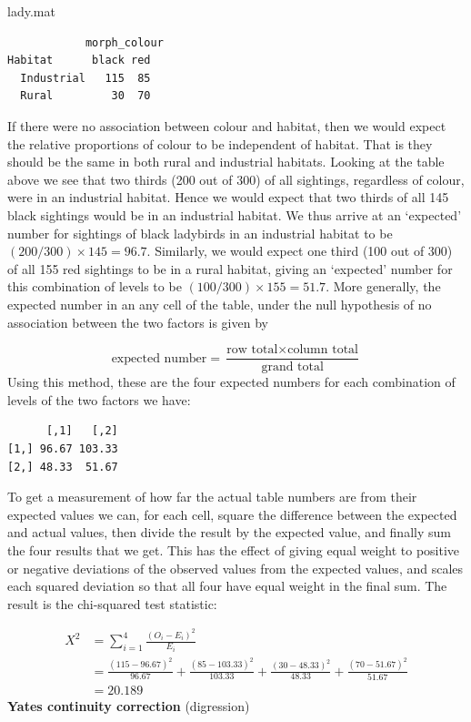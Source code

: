 \documentclass[
  letterpaper,
  DIV=11,
  numbers=noendperiod]{scrreprt}
\newenvironment{Shaded}{\begin{snugshade}}{\end{snugshade}}
\newcommand{\NormalTok}[1]{\textcolor[rgb]{0.00,0.23,0.31}{#1}}
\begin{document}
\begin{Shaded}
\begin{Highlighting}[]
\NormalTok{lady.mat}
\end{Highlighting}
\end{Shaded}

\begin{verbatim}
            morph_colour
Habitat      black red
  Industrial   115  85
  Rural         30  70
\end{verbatim}

If there were no association between colour and habitat, then we would
expect the relative proportions of colour to be independent of habitat.
That is they should be the same in both rural and industrial habitats.
Looking at the table above we see that two thirds (200 out of 300) of
all sightings, regardless of colour, were in an industrial habitat.
Hence we would expect that two thirds of all 145 black sightings would
be in an industrial habitat. We thus arrive at an `expected' number for
sightings of black ladybirds in an industrial habitat to be
\((200/300) \times 145 = 96.7\). Similarly, we would expect one third
(100 out of 300) of all 155 red sightings to be in a rural habitat,
giving an `expected' number for this combination of levels to be
\((100/300)\times 155 = 51.7\). More generally, the expected number in
an any cell of the table, under the null hypothesis of no association
between the two factors is given by

\[\text{expected number}=\frac{\text{row total}\times\text{column total}}{\text{grand total}}\]
Using this method, these are the four expected numbers for each
combination of levels of the two factors we have:

\begin{verbatim}
      [,1]   [,2]
[1,] 96.67 103.33
[2,] 48.33  51.67
\end{verbatim}

To get a measurement of how far the actual table numbers are from their
expected values we can, for each cell, square the difference between the
expected and actual values, then divide the result by the expected
value, and finally sum the four results that we get. This has the effect
of giving equal weight to positive or negative deviations of the
observed values from the expected values, and scales each squared
deviation so that all four have equal weight in the final sum. The
result is the chi-squared test statistic:

\[
\begin{align*}
X^2&=\sum_{i=1}^4\frac{(O_i-E_i)^2}{E_i}\\
&=\frac{(115-96.67)^2}{96.67} + \frac{(85-103.33)^2}{103.33} + \frac{(30-48.33)^2}{48.33} + \frac{(70-51.67)^2}{51.67}\\
&=20.189
\end{align*}
\] \textbf{Yates continuity correction} (digression)
\end{document}
